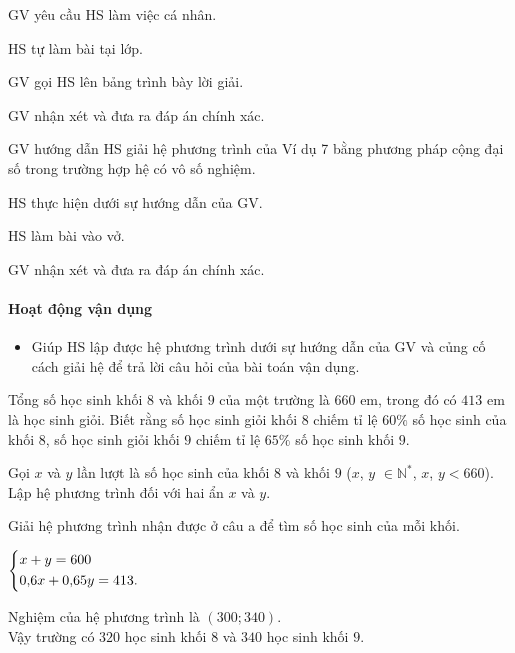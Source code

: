 \begin{tcth}[luyentap=5]
    \buocmot
    \item  GV yêu cầu HS làm việc cá nhân.
    \buochai
    \item HS tự làm bài tại lớp.
    \buocba
    \item GV gọi HS lên bảng trình bày lời giải.
    \buocbon
    \item GV nhận xét và đưa ra đáp án chính xác.
\end{tcth}

\begin{tcth}[vidu=6]
    \buocmot
    \item  GV hướng dẫn HS giải hệ phương trình của Ví dụ 7 bằng phương pháp cộng đại số trong trường hợp hệ có vô số nghiệm.
    \buochai
    \item HS thực hiện dưới sự hướng dẫn của GV. 
    \buocba
    \item HS làm bài vào vở.
    \buocbon
    \item GV nhận xét và đưa ra đáp án chính xác.
\end{tcth}

\paragraph{Hoạt động vận dụng}

\muctieu

\begin{itemize}
    \item Giúp HS lập được hệ phương trình dưới sự hướng dẫn của GV và củng cố cách giải hệ để trả lời câu hỏi của bài toán vận dụng.
\end{itemize}

\noidungsanpham

\begin{vandung}
    Tổng số học sinh khối $8$ và khối $9$ của một trường là $660$ em, trong đó có $413$ em là học sinh giỏi. Biết rằng số học sinh giỏi khối $8$ chiếm tỉ lệ $60 \%$ số học
    sinh của khối $8$, số học sinh giỏi khối $9$ chiếm tỉ lệ $65 \%$ số học sinh khối $9$.
    \begin{listEX}
        \item Gọi $x$ và $y$ lần lượt là số học sinh của khối $8$ và khối $9$ ($x$, $y$ $\in\mathbb{N}^*$, $x$, $y< 660$). Lập hệ phương trình đối với hai ẩn $x$ và $y$.
        \item Giải hệ phương trình nhận được ở câu a để tìm số học sinh của mỗi khối.
    \end{listEX}
    \doicot
    \begin{listEX}
        \item $\left\{\begin{aligned}&x+y=600\\&0{,}6x+0{,}65y=413.\end{aligned}\right.$
        \item Nghiệm của hệ phương trình là $(300;340)$.\\
        Vậy trường có $320$ học sinh khối $8$ và $340$ học sinh khối $9$.
    \end{listEX}
\end{vandung}

